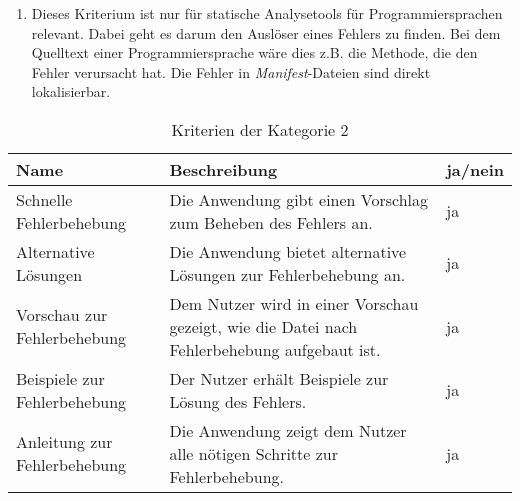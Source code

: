 \begin{enumerate}[label= (\arabic*)]
    \item Dieses Kriterium ist nur für statische Analysetools für Programmiersprachen relevant. Dabei geht es darum den Auslöser eines Fehlers zu finden.
          Bei dem Quelltext einer Programmiersprache wäre dies z.B. die Methode, die den Fehler verursacht hat.
          Die Fehler in \textit{Manifest}-Dateien sind direkt lokalisierbar.
\end{enumerate}

\FloatBarrier

\begin{table}[htp]
    \centering
    \begin{tabularx}{\columnwidth}{lXl}
        \toprule
        \textbf{Name}                & \textbf{Beschreibung}                                                                       & \textbf{ja/nein} \\
        \midrule
        Schnelle Fehlerbehebung      & Die Anwendung gibt einen Vorschlag zum Beheben des Fehlers an.                              & ja               \\
        \midrule
        Alternative Lösungen         & Die Anwendung bietet alternative Lösungen zur Fehlerbehebung an.                            & ja               \\
        \midrule
        Vorschau zur Fehlerbehebung  & Dem Nutzer wird in einer Vorschau gezeigt, wie die Datei nach Fehlerbehebung aufgebaut ist. & ja               \\
        \midrule
        Beispiele zur Fehlerbehebung & Der Nutzer erhält Beispiele zur Lösung des Fehlers.                                         & ja               \\
        \midrule
        Anleitung zur Fehlerbehebung & Die Anwendung zeigt dem Nutzer alle nötigen Schritte zur Fehlerbehebung.                    & ja               \\
        \bottomrule
    \end{tabularx}
    \caption{Kriterien der Kategorie 2}
    \label{tbl:criteria-category-2}
\end{table}

